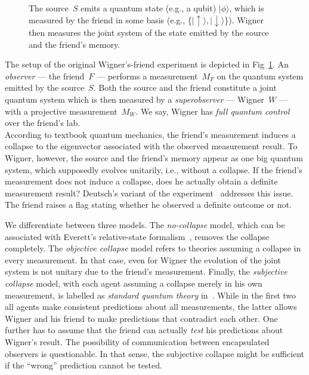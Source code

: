 \documentclass[aps,pra,12pt]{revtex4-2}
\newcommand{\ket}[1]{|#1 \rangle}
\newcommand{\da}{\downarrow}
\newcommand{\ua}{\uparrow}
\theoremstyle{definition}
\theoremstyle{remark}
\begin{document}
\begin{figure}
\centering
{}
\caption{The source~$S$ emits a quantum state (e.g., a qubit) $\ket{\phi}$, which is measured by the friend in some basis (e.g., \{$\ket{\ua}, \ket{\da}$\}). Wigner then measures the joint system of the state emitted by the source and the friend's memory.}
\label{fig:Wigner}
\end{figure}
The setup of the original Wigner's-friend experiment is depicted in Fig~\ref{fig:Wigner}.
An \emph{observer} --- the friend~$F$ --- performs a measurement~$M_F$ on the quantum system emitted by the source~$S$.
Both the source and the friend constitute a joint quantum system which is then measured by a \emph{superobserver} --- Wigner~$W$ --- with a projective measurement~$M_W$.
We say, Wigner has \emph{full quantum control} over the friend's lab.\\
According to textbook quantum mechanics, the friend's measurement induces a collapse to the eigenvector associated with the observed measurement result.
To Wigner, however, the source and the friend's memory appear as one big quantum system, which supposedly evolves unitarily, i.e., without a collapse.
If the friend's measurement does not induce a collapse, does he actually obtain a definite measurement result?
Deutsch's variant of the experiment~\cite{deutsch1985quantum} addresses this issue. 
The friend raises a flag stating whether he observed a definite outcome or not.

We differentiate between three models. 
The \emph{no-collapse} model, which can be associated with Everett's relative-state formalism~\cite{everett1957relative}, removes the collapse completely.
The \emph{objective collapse} model refers to theories assuming a collapse in every measurement. 
In that case, even for Wigner the evolution of the joint system is not unitary due to the friend's measurement.
Finally, the \emph{subjective collapse} model, with each agent assuming a collapse merely in his own measurement, is labelled as \emph{standard quantum theory} in~\cite{FrRen}.  
While in the first two all agents make consistent predictions about all measurements, the latter allows Wigner and his friend to make predictions that contradict each other.
One further has to assume that the friend can actually \emph{test} his predictions about Wigner's result.
The possibility of communication between encapsulated observers is questionable.
In that sense, the subjective collapse might be sufficient if the ``wrong'' prediction cannot be tested.
\end{document}
